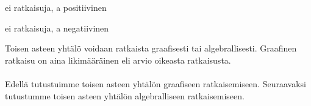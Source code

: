 \begin{lukusuora}{-2}{2}{4}
\end{lukusuora}

ei ratkaisuja, a positiivinen

\begin{lukusuora}{-2}{2}{4}
\end{lukusuora}

ei ratkaisuja, a negatiivinen

\begin{lukusuora}{-2}{2}{4}
\end{lukusuora}

Toisen asteen yhtälö voidaan ratkaista graafisesti tai algebrallisesti. Graafinen ratkaisu on aina likimääräinen eli arvio oikeasta ratkaisusta. \\ \\ Edellä tutustuimme toisen asteen yhtälön graafiseen ratkaisemiseen. Seuraavaksi tutustumme toisen asteen yhtälön algebralliseen ratkaisemiseen.
